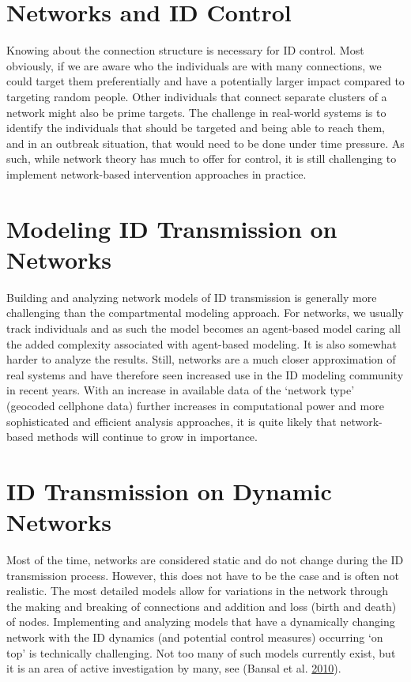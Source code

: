 \documentclass[]{book}
\theoremstyle{definition}
\theoremstyle{definition}
\theoremstyle{definition}
\theoremstyle{remark}
\begin{document}
\section{Networks and ID Control}\label{networks-and-id-control}

Knowing about the connection structure is necessary for ID control. Most
obviously, if we are aware who the individuals are with many
connections, we could target them preferentially and have a potentially
larger impact compared to targeting random people. Other individuals
that connect separate clusters of a network might also be prime targets.
The challenge in real-world systems is to identify the individuals that
should be targeted and being able to reach them, and in an outbreak
situation, that would need to be done under time pressure. As such,
while network theory has much to offer for control, it is still
challenging to implement network-based intervention approaches in
practice.

\section{Modeling ID Transmission on
Networks}\label{modeling-id-transmission-on-networks}

Building and analyzing network models of ID transmission is generally
more challenging than the compartmental modeling approach. For networks,
we usually track individuals and as such the model becomes an
agent-based model caring all the added complexity associated with
agent-based modeling. It is also somewhat harder to analyze the results.
Still, networks are a much closer approximation of real systems and have
therefore seen increased use in the ID modeling community in recent
years. With an increase in available data of the `network type'
(geocoded cellphone data) further increases in computational power and
more sophisticated and efficient analysis approaches, it is quite likely
that network-based methods will continue to grow in importance.

\section{ID Transmission on Dynamic
Networks}\label{id-transmission-on-dynamic-networks}

Most of the time, networks are considered static and do not change
during the ID transmission process. However, this does not have to be
the case and is often not realistic. The most detailed models allow for
variations in the network through the making and breaking of connections
and addition and loss (birth and death) of nodes. Implementing and
analyzing models that have a dynamically changing network with the ID
dynamics (and potential control measures) occurring `on top' is
technically challenging. Not too many of such models currently exist,
but it is an area of active investigation by many, see (Bansal et al.
\protect\hyperlink{ref-bansal10}{2010}).
\end{document}
